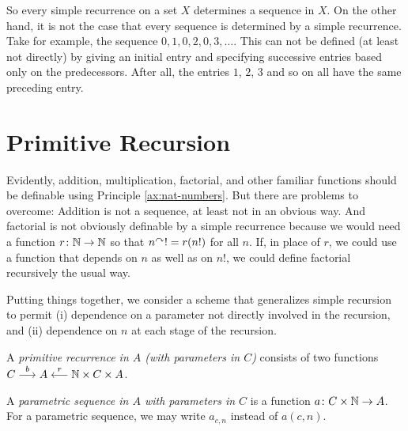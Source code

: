 So every simple recurrence on a set $X$ determines a sequence in $X$. 
On the other hand, it is not the case that every sequence is determined by a simple recurrence.
Take for example, the sequence $0,1,0,2,0,3,\ldots$. 
This can not be defined (at least not directly) by giving an initial entry and specifying successive entries based only on the predecessors. 
After all, the entries $1$, $2$, $3$ and so on all have the same preceding entry.


\section{Primitive Recursion}

Evidently, addition, multiplication, factorial, and other familiar functions should be definable using Principle \ref{ax:nat-numbers}. 
But there are problems to overcome: Addition is not a sequence, at least not in an obvious way. And factorial is not obviously definable by a simple recurrence
because we would need a function ${r}\colon{\mathbb N}\to{\mathbb N}$ so that $n^\curvearrowright! = r(n!)$
for all $n$. If, in place of $r$, we could use a function that depends on $n$ as well as on $n!$, we could define factorial recursively the usual way.

Putting things together, we consider a scheme that generalizes simple recursion to permit (i) dependence on a parameter not directly involved in the recursion, and
(ii) dependence on $n$ at each stage of the recursion.

\begin{defn}
	A \emph{primitive recurrence in $A$ (with parameters in $C$)} consists of two  functions $C\stackrel{b}{\longrightarrow} A\stackrel{r}{\longleftarrow}\mathbb N\times C\times A$.
	
	A \emph{parametric sequence in $A$ with parameters in $C$} is a function
	${a}\colon{C\times \mathbb N}\to{A}$. For a parametric sequence, we may write $a_{c,n}$
	instead of $a(c,n)$. 
\end{defn}

